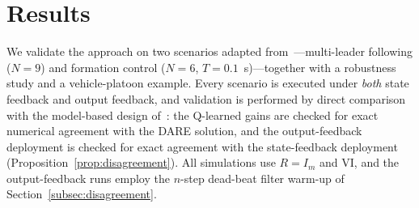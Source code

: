 \documentclass[12pt]{elsarticle}
\theoremstyle{remark}
\begin{document}
\section{Results}
\label{sec:results}
We validate the approach on two scenarios adapted from~\cite{cacace2024}---multi-leader following ($N{=}9$) and formation control ($N{=}6$, $T = 0.1$~s)---together with a robustness study and a vehicle-platoon example. Every scenario is executed under \emph{both} state feedback and output feedback, and validation is performed by direct comparison with the model-based design of~\cite{cacace2024}: the Q-learned gains are checked for exact numerical agreement with the DARE solution, and the output-feedback deployment is checked for exact agreement with the state-feedback deployment (Proposition~\ref{prop:disagreement}). All simulations use $R = I_m$ and VI, and the output-feedback runs employ the $n$-step dead-beat filter warm-up of Section~\ref{subsec:disagreement}.
\end{document}
